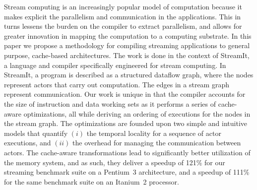 
Stream computing is an increasingly popular model of computation
because it makes explicit the parallelism and communication in the
applications. This in turns lessens the burden on the compiler to
extract parallelism, and allows for greater innovation in mapping the
computation to a computing substrate. In this paper we propose a
methodology for compiling streaming applications to general purpose,
cache-based architectures. The work is done in the context of
StreamIt, a language and compiler specifically engineered for stream
computing. In StreamIt, a program is described as a structured dataflow
graph, where the nodes represent actors that carry out 
computation. The edges in a stream graph represent
communication. Our work is unique in that the compiler
accounts for the size of instruction and data working sets as it
performs a series of cache-aware optimizations, all while deriving an
ordering of executions for the nodes in the stream graph. The
optimizations are founded upon two simple and intuitive models that
quantify $(i)$ the temporal locality for a sequence of  actor
executions, and $(ii)$ the overhead for managing the communication
between actors. The cache-aware transformations lead to significantly
better utilization of the memory system, and as such, they deliver
a speedup of 121\% for our streaming benchmark suite on a Pentium~3 
architecture, and a speedup of 111\% for the same benchmark suite on
an Itanium~2 processor.

